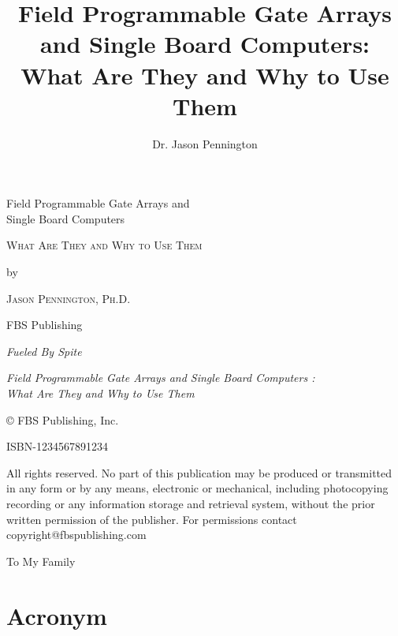 \documentclass[11pt]{book}
\title{Field Programmable Gate Arrays and Single Board Computers: What Are They and Why to Use Them}
\author{Dr. Jason Pennington}
\date{}
\newenvironment{dedication}
{\clearpage           %
	\thispagestyle{empty}%
	\vspace*{\stretch{1}}%
	\itshape             %
	\raggedleft          %
}
{\par %
	\vspace{\stretch{3}} %
	\clearpage           %
}
\begin{document}
\frontmatter



\begin{titlepage}
		\centering
		\vspace{4\baselineskip}
		{\Huge 
			Field Programmable Gate Arrays and\\ Single Board Computers\par}
		\vspace{1\baselineskip}
		\par
		{\Large\textsc{What Are They and Why to Use Them}\par}
		\vspace{4\baselineskip}
		by\par
		{\large\textsc{Jason Pennington, Ph.D.}\par}
		\vfill
		FBS Publishing\par
		{\em Fueled By Spite}
\end{titlepage}


	
\begin{flushleft}
		
		\textit{Field Programmable Gate Arrays and Single Board Computers :\\What Are They and Why to Use Them}
		
		\vfill	
		\textsf{\copyright} FBS Publishing, Inc. 
		
		\vspace{1\baselineskip}		
		
		ISBN-1234567891234
		
		\vspace{1\baselineskip}
		
		\noindent All rights reserved. No part of this publication may be produced or transmitted in any form or by any means, electronic or mechanical, including photocopying recording or any information storage and retrieval system, without the prior written permission of the publisher. For permissions contact copyright@fbspublishing.com
\end{flushleft}

\begin{dedication}
	To My Family  
\end{dedication}


\tableofcontents


\mainmatter











\backmatter


\clearpage
\chapter{Acronym}

\printindex


\end{document}
